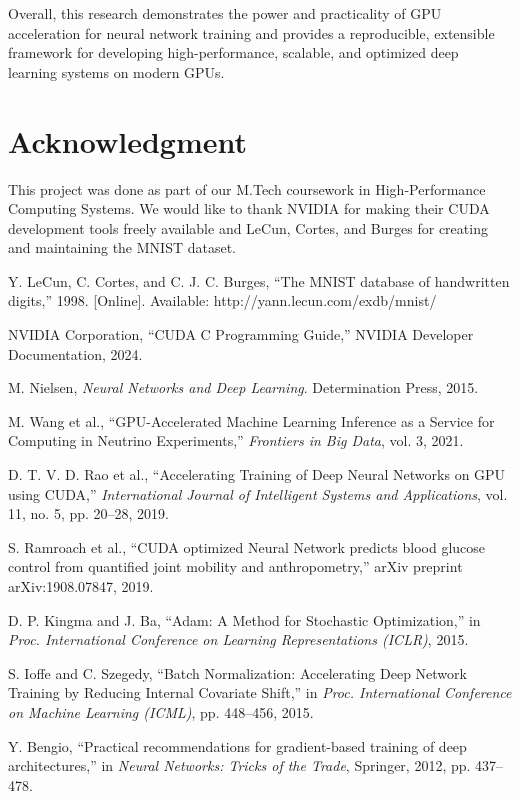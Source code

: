 \documentclass[conference]{IEEEtran}
\begin{document}
Overall, this research demonstrates the power and practicality of GPU acceleration for neural network training and provides a reproducible, extensible framework for developing high-performance, scalable, and optimized deep learning systems on modern GPUs.


\section*{Acknowledgment}

This project was done as part of our M.Tech coursework in High-Performance Computing Systems. We would like to thank NVIDIA for making their CUDA development tools freely available and LeCun, Cortes, and Burges for creating and maintaining the MNIST dataset.

\begin{thebibliography}{00}

 Y. LeCun, C. Cortes, and C. J. C. Burges, ``The MNIST database of handwritten digits,'' 1998. [Online]. Available: http://yann.lecun.com/exdb/mnist/

 NVIDIA Corporation, ``CUDA C Programming Guide,'' NVIDIA Developer Documentation, 2024.

 M. Nielsen, \textit{Neural Networks and Deep Learning}. Determination Press, 2015.

 M. Wang et al., ``GPU-Accelerated Machine Learning Inference as a Service for Computing in Neutrino Experiments,'' \textit{Frontiers in Big Data}, vol. 3, 2021.

 D. T. V. D. Rao et al., ``Accelerating Training of Deep Neural Networks on GPU using CUDA,'' \textit{International Journal of Intelligent Systems and Applications}, vol. 11, no. 5, pp. 20–28, 2019.

 S. Ramroach et al., ``CUDA optimized Neural Network predicts blood glucose control from quantified joint mobility and anthropometry,'' arXiv preprint arXiv:1908.07847, 2019.

 D. P. Kingma and J. Ba, ``Adam: A Method for Stochastic Optimization,'' in \textit{Proc. International Conference on Learning Representations (ICLR)}, 2015.

 S. Ioffe and C. Szegedy, ``Batch Normalization: Accelerating Deep Network Training by Reducing Internal Covariate Shift,'' in \textit{Proc. International Conference on Machine Learning (ICML)}, pp. 448–456, 2015.

 Y. Bengio, ``Practical recommendations for gradient-based training of deep architectures,'' in \textit{Neural Networks: Tricks of the Trade}, Springer, 2012, pp. 437–478.


\end{thebibliography}
\end{document}
